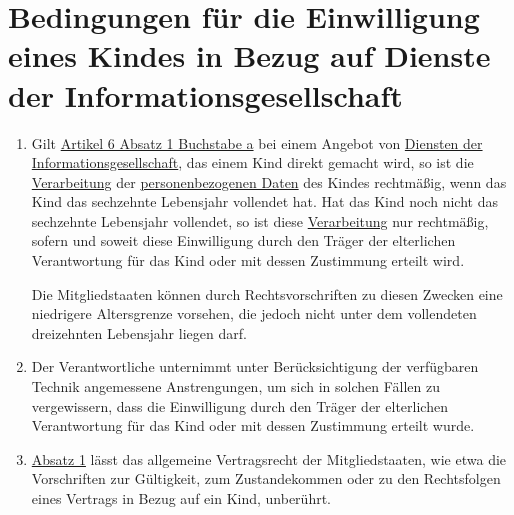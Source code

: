 \chapter{Bedingungen für die Einwilligung eines Kindes in Bezug auf Dienste der Informationsgesellschaft}
\label{ch:8}


\begin{enumerate}

  \item Gilt \hyperref[itm:06-1a]{Artikel 6 Absatz 1 Buchstabe a} bei einem Angebot von \hyperref[itm:04-28]{Diensten der
   Informationsgesellschaft}, das einem Kind direkt gemacht wird, so ist die \hyperref[itm:04-2]{Verarbeitung} der \hyperref[itm:04-1]{personenbezogenen Daten}
   des Kindes rechtmäßig, wenn das Kind das sechzehnte Lebensjahr vollendet hat. Hat das Kind noch nicht das sechzehnte
   Lebensjahr vollendet, so ist diese \hyperref[itm:04-2]{Verarbeitung} nur rechtmäßig, sofern und soweit diese Einwilligung durch den
   Träger der elterlichen Verantwortung für das Kind oder mit dessen Zustimmung erteilt wird. 
  \label{itm:08-1}

   Die Mitgliedstaaten können durch Rechtsvorschriften zu diesen Zwecken eine niedrigere Altersgrenze vorsehen, die
   jedoch nicht unter dem vollendeten dreizehnten Lebensjahr liegen darf.

  \item Der Verantwortliche unternimmt unter Berücksichtigung der verfügbaren Technik angemessene Anstrengungen, um sich
   in solchen Fällen zu vergewissern, dass die Einwilligung durch den Träger der elterlichen Verantwortung für das Kind
   oder mit dessen Zustimmung erteilt wurde.
  \label{itm:08-2}

  \item \hyperref[itm:08-1]{Absatz 1} lässt das allgemeine Vertragsrecht der Mitgliedstaaten, wie etwa die Vorschriften
   zur Gültigkeit, zum Zustandekommen oder zu den Rechtsfolgen eines Vertrags in Bezug auf ein Kind, unberührt.
  \label{itm:08-3}

\end{enumerate}


